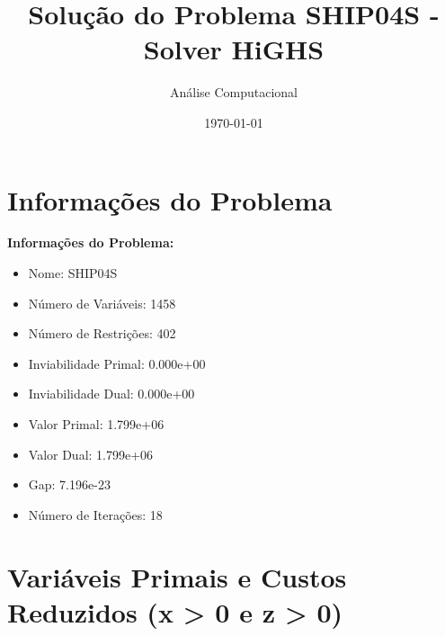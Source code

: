 \documentclass[12pt]{article}
\title{Solução do Problema SHIP04S - Solver HiGHS}
\author{Análise Computacional}
\date{\today}
\begin{document}
\maketitle

\section{Informações do Problema}

\textbf{Informações do Problema:}
\begin{itemize}
\item Nome: SHIP04S
\item Número de Variáveis: 1458
\item Número de Restrições: 402
\item Inviabilidade Primal: 0.000e+00
\item Inviabilidade Dual: 0.000e+00
\item Valor Primal: 1.799e+06
\item Valor Dual: 1.799e+06
\item Gap: 7.196e-23
\item Número de Iterações: 18
\end{itemize}


\section{Variáveis Primais e Custos Reduzidos (x > 0 e z > 0)}
\end{document}
